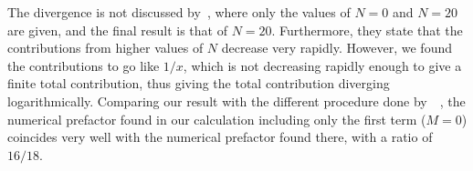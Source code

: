 The divergence is not discussed by~\citeauthor{arjonaFingerprintsConformalAnomaly2019}, where only the values of $N = 0$ and  $N=20$ are given, and the final result is that of $N=20$.
Furthermore, they state that the contributions from higher values of $N$ decrease very rapidly.
However, we found the contributions to go like $1 /x$, which is not decreasing rapidly enough to give a finite total contribution, thus giving the total contribution diverging logarithmically.
Comparing our result with the different procedure done by~\citeauthor{chernodubGenerationNernstCurrent2018}~\cite{chernodubGenerationNernstCurrent2018}, the numerical prefactor found in our calculation including only the first term ($M=0$) coincides very well with the numerical prefactor found there, with a ratio of $16 / 18$.
